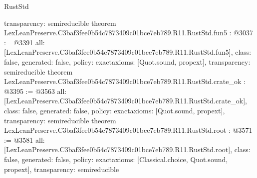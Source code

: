 \begin{lexlean}{RustStd}
\begin{coremodule}
{  transparency: semireducible
}
theorem LexLeanPreserve.C3baf3fee0b54c7873409c01bce7eb789.R11.RustStd.fun5 : @3037 := @3391 {
  all: [LexLeanPreserve.C3baf3fee0b54c7873409c01bce7eb789.R11.RustStd.fun5],
  class: false,
  generated: false,
  policy: exact{axioms: [Quot.sound, propext]},
  transparency: semireducible
}
theorem LexLeanPreserve.C3baf3fee0b54c7873409c01bce7eb789.R11.RustStd.crate_ok : @3395 := @3563 {
  all: [LexLeanPreserve.C3baf3fee0b54c7873409c01bce7eb789.R11.RustStd.crate_ok],
  class: false,
  generated: false,
  policy: exact{axioms: [Quot.sound, propext]},
  transparency: semireducible
}
theorem LexLeanPreserve.C3baf3fee0b54c7873409c01bce7eb789.R11.RustStd.root : @3571 := @3581 {
  all: [LexLeanPreserve.C3baf3fee0b54c7873409c01bce7eb789.R11.RustStd.root],
  class: false,
  generated: false,
  policy: exact{axioms: [Classical.choice, Quot.sound, propext]},
  transparency: semireducible
}


\end{coremodule}
\end{lexlean}
